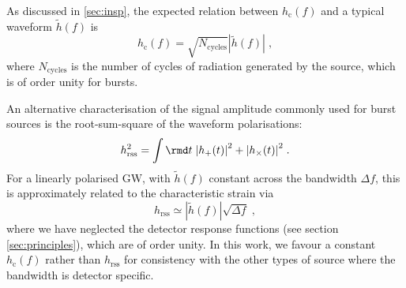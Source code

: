 As discussed in \ref{sec:insp}, the expected relation between $h_\mathrm{c}(f)$ and a typical waveform $\tilde{h}(f)$ is
\begin{equation}\label{eq:simple} 
h_\mathrm{c}(f) = \sqrt{{N}_{\mathrm{cycles}}}\left|\tilde{h}(f)\right| \; , 
\end{equation}
where ${N}_{\mathrm{cycles}}$ is the number of cycles of radiation generated by the source, which is of order unity for bursts. 

An alternative characterisation of the signal amplitude commonly used for burst sources is the root-sum-square of the waveform polarisations:
\begin{equation}
h_\mathrm{rss}^2 = \int \rmd t \; {|h_+(t)|}^2 + {|h_\times(t)|}^2 \; .
\end{equation}
For a linearly polarised GW, with $\tilde{h}(f)$ constant across the bandwidth $\Delta f$, this is approximately related to the characteristic strain via 
\begin{equation}
h_\mathrm{rss} \simeq |\tilde{h}(f)|\sqrt{\Delta f}\;,\label{eq:rela}
\end{equation}
where we have neglected the detector response functions (see section \ref{sec:principles}), which are of order unity. In this work, we favour a constant $h_\mathrm{c}(f)$ rather than $h_\mathrm{rss}$ for consistency with the other types of source where the bandwidth is detector specific.

